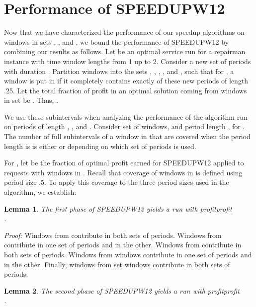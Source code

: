 \documentclass[11pt]{article}
\newtheorem{lemma}{Lemma}[section]
\newcommand\QED{\ifhmode\allowbreak\else\nobreak\fi
\quad\nobreak\medbreak}
\newcommand{\proofstart}{\par\noindent \emph{Proof:} }
\newcommand{\proofend}{\QED\par}
\newenvironment{proof}{\proofstart}{\proofend}
\begin{document}
\section{Performance of SPEEDUPW12}
\label{section:performance of speedupw12}

Now that we have characterized the performance of our speedup algorithms on windows in sets , , and , we bound the performance of SPEEDUPW12 by combining our results as follows.
Let  be an optimal service run for a repairman instance with time window lengths from 1 up to 2.
Consider a new set of periods with duration . Partition windows into the sets , , , , and , such that for , a window is put in  if it completely contains exactly  of these new periods of length .25.  Let the total fraction of profit in an optimal solution coming from windows in set  be .  Thus, .


We use these subintervals when analyzing the performance of the algorithm run on periods of length , , and .  Consider set  of windows,  and period length , for .
The number of full subintervals of a window in  that are covered when the period length is  is either
 or 
depending on which set of periods is used.

For , let  be the fraction of optimal profit earned for SPEEDUPW12
applied to requests with windows in .  Recall that coverage of windows in  is defined using period size .5.  To apply this coverage to the three period sizes used in the algorithm, we establish:

\begin{lemma}
\label{lemma:phase1}
The first phase of SPEEDUPW12 yields a run  with 
profitprofit\\
\hspace*{.2in}.
\end{lemma}

\begin{proof}
Windows from  contribute  in both sets of periods.  Windows from  contribute  in one set of periods and  in the other.  Windows from  contribute  in both sets of periods.  Windows from  windows contribute  in one set of periods and  in the other.  Finally, windows from set  windows contribute  in both sets of periods.
\end{proof}

\begin{lemma}
\label{lemma:phase2}
The second phase of SPEEDUPW12 yields a run  with profitprofit\\
\hspace*{.2in}.
\end{lemma}
\end{document}
